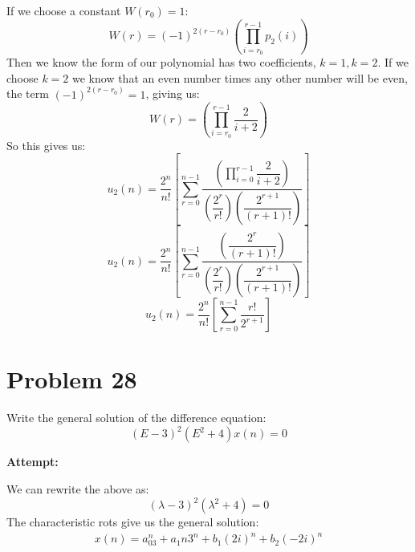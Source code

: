 \documentclass[12pt,letterpaper]{article}
\theoremstyle{definition}
\begin{document}
\begin{changemargin}{.5cm}{0cm}
\begin{enumerate}[label=(\alph*)]
    
    If we choose a constant $W(r_0)=1$:
    \begin{equation*}
        W(r) = (-1)^{2(r-r_0)}\left(\prod_{i=r_0}^{r-1}p_2(i) \right)
    \end{equation*}
    Then we know the form of our polynomial has two coefficients, $k=1,k=2$. If we choose $k=2$ we know that an even number times any other number will be even, the term $(-1)^{2(r-r_0)}=1$, giving us:
    \begin{equation*}
        W(r) =\left(\prod_{i=r_0}^{r-1}\dfrac{2}{i+2} \right)
    \end{equation*}
    So this gives us:
    \begin{equation*}
        u_2(n) = \dfrac{2^n}{n!} \left[\sum_{r=0}^{n-1}\frac{\left(\prod_{i=0}^{r-1}\dfrac{2}{i+2} \right)}{\left(\dfrac{2^r}{r!}\right)\left(\dfrac{2^{r+1}}{(r+1)!}\right)} \right]
    \end{equation*}
    \begin{equation*}
        u_2(n) = \dfrac{2^n}{n!} \left[\sum_{r=0}^{n-1}\frac{\left(\dfrac{2^{r}}{(r+1)!} \right)}{\left(\dfrac{2^r}{r!}\right)\left(\dfrac{2^{r+1}}{(r+1)!}\right)} \right]
    \end{equation*}
    \begin{equation*}
        u_2(n) = \dfrac{2^n}{n!} \left[\sum_{r=0}^{n-1}\dfrac{r!}{2^{r+1}} \right]
    \end{equation*}
\end{enumerate}

\end{changemargin}
\newpage


\section*{Problem 28}

Write the general solution of the difference equation:
\begin{equation*}
    (E-3)^2(E^2+4)x(n)=0
\end{equation*}



\textbf{Attempt:}

    \begin{changemargin}{.5cm}{0cm}
        We can rewrite the above as:
        \begin{equation*}
            (\lambda-3)^2(\lambda^2+4)=0
        \end{equation*}
        The characteristic rots give us the general solution:
        \begin{align*}
            x(n) = a_03^n + a_1n3^n + b_1(2i)^n+b_2(-2i)^n
        \end{align*}

        
    \end{changemargin}
\end{document}
